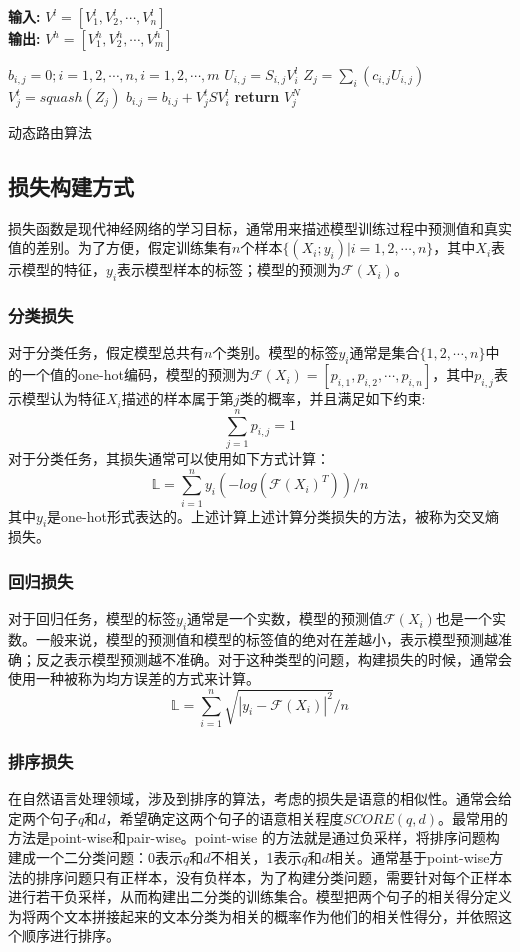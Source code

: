 \documentclass[twoside,a4paper,12pt]{book}%
\begin{document}
\begin{algorithm}[h]
    \textbf{输入:} $V^l=[V^l_1,V^l_2,\cdots, V^l_n]$\\
    \textbf{输出:} $V^h=[V^h_1,V^h_2,\cdots, V^h_m]$ 
    \begin{algorithmic}[1]
	\STATE $b_{i,j}=0; i={1,2,\cdots ,n},i={1,2,\cdots ,m}$    
        \STATE $U_{i,j}=S_{i,j}V_i^l$
        \STATE $Z_j=\sum_{i}(c_{i,j}U_{i,j})$
        \STATE $V_j^{t} = squash(Z_j)$ 
        \STATE $b_{i.j} = b_{i.j} + V_j^{t} S V_i^{l} $         
    \ENDFOR 
    \STATE \textbf{return} $V_j^{N}$ 
    \end{algorithmic}
    \caption{动态路由算法}
    \label{alg:dr}
\end{algorithm}

\subsection{损失构建方式}
损失函数是现代神经网络的学习目标，通常用来描述模型训练过程中预测值和真实值的差别。为了方便，假定训练集有$n$个样本$\{(X_i;y_i)|i=1,2,\cdots,n\}$，其中$X_i$表示模型的特征，$y_i$表示模型样本的标签；模型的预测为$\mathcal{F}(X_i)$。
\subsubsection{分类损失}
对于分类任务，假定模型总共有$n$个类别。模型的标签$y_i$通常是集合$\{1,2,\cdots,n\}$中的一个值的one-hot编码，模型的预测为$\mathcal{F}(X_i)=[p_{i,1},p_{i,2},\cdots,p_{i,n}]$，其中$p_{i,j}$表示模型认为特征$X_i$描述的样本属于第$j$类的概率，并且满足如下约束:
$$
\sum_{j=1}^{n}p_{i,j}=1
$$
对于分类任务，其损失通常可以使用如下方式计算：
$$
\mathbb{L}=\sum_{i=1}^{n}{y_i(-log(\mathcal{F}(X_i)^T))}/n
$$
其中$y_i$是one-hot形式表达的。上述计算上述计算分类损失的方法，被称为交叉熵损失。
\subsubsection{回归损失}
对于回归任务，模型的标签$y_i$通常是一个实数，模型的预测值$\mathcal{F}(X_i)$也是一个实数。一般来说，模型的预测值和模型的标签值的绝对在差越小，表示模型预测越准确；反之表示模型预测越不准确。对于这种类型的问题，构建损失的时候，通常会使用一种被称为均方误差的方式来计算。
$$
\mathbb{L}=\sum_{i=1}^{n}{\sqrt{|y_i-\mathcal{F}(X_i)|^2}}/n
$$
\subsubsection{排序损失}
在自然语言处理领域，涉及到排序的算法，考虑的损失是语意的相似性。通常会给定两个句子$q$和$d$，希望确定这两个句子的语意相关程度$SCORE(q,d)$。最常用的方法是point-wise和pair-wise。point-wise 的方法就是通过负采样，将排序问题构建成一个二分类问题：0表示$q$和$d$不相关，1表示$q$和$d$相关。通常基于point-wise方法的排序问题只有正样本，没有负样本，为了构建分类问题，需要针对每个正样本进行若干负采样，从而构建出二分类的训练集合。模型把两个句子的相关得分定义为将两个文本拼接起来的文本分类为相关的概率作为他们的相关性得分，并依照这个顺序进行排序。
\end{document}
